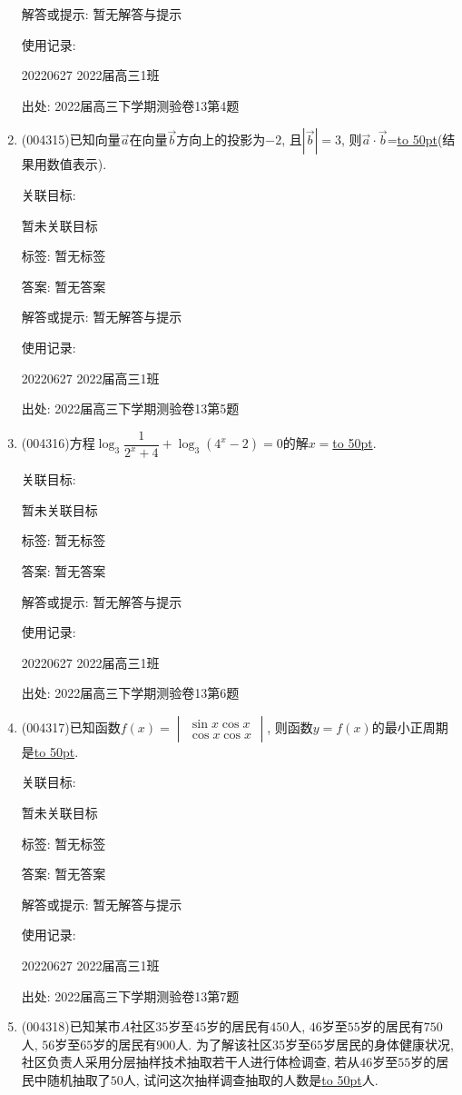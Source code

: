 \documentclass[10pt,a4paper]{article}
\newcommand{\blank}[1]{\underline{\hbox to #1pt{}}}
\begin{document}
\begin{enumerate}[1.]
解答或提示: 暂无解答与提示

使用记录:

20220627	2022届高三1班	


出处: 2022届高三下学期测验卷13第4题
\item { (004315)}已知向量$\overrightarrow a$在向量$\overrightarrow b$方向上的投影为$-2$, 且$|\overrightarrow b|=3$, 则$\overrightarrow a\cdot \overrightarrow b$=\blank{50}(结果用数值表示).


关联目标:

暂未关联目标



标签: 暂无标签

答案: 暂无答案

解答或提示: 暂无解答与提示

使用记录:

20220627	2022届高三1班	


出处: 2022届高三下学期测验卷13第5题
\item { (004316)}方程$\log_3\dfrac 1{2^x+4}+\log_3(4^x-2)=0$的解$x=$\blank{50}.


关联目标:

暂未关联目标



标签: 暂无标签

答案: 暂无答案

解答或提示: 暂无解答与提示

使用记录:

20220627	2022届高三1班	


出处: 2022届高三下学期测验卷13第6题
\item { (004317)}已知函数$f(x)=\begin{vmatrix} \sin x  \cos x  \\ \cos x  \cos x  \end{vmatrix}$, 则函数$y=f(x)$的最小正周期是\blank{50}.


关联目标:

暂未关联目标



标签: 暂无标签

答案: 暂无答案

解答或提示: 暂无解答与提示

使用记录:

20220627	2022届高三1班	


出处: 2022届高三下学期测验卷13第7题
\item { (004318)}已知某市$A$社区$35$岁至$45$岁的居民有$450$人, $46$岁至$55$岁的居民有$750$人, $56$岁至$65$岁的居民有$900$人. 为了解该社区$35$岁至$65$岁居民的身体健康状况, 社区负责人采用分层抽样技术抽取若干人进行体检调查, 若从$46$岁至$55$岁的居民中随机抽取了$50$人, 试问这次抽样调查抽取的人数是\blank{50}人.



\end{enumerate}
\end{document}
